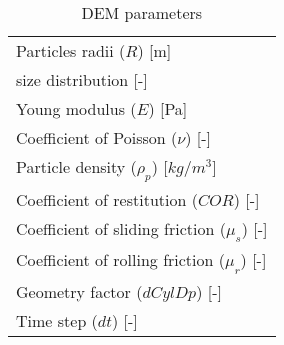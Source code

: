 \begin{table}[h]
\centering
\begin{tabular}{l}
\hline 
    Particles radii ($R$) [m]   \\ [5pt]

	size distribution [-] \\ [5pt]

    Young modulus ($E$) [Pa] \\ [5pt]

    Coefficient of Poisson ($\nu$) [-] \\ 
        \hline
    Particle density ($\rho_p$) [$kg/m^3$] \\ [5pt]
	Coefficient of restitution ($COR$) [-] \\ [5pt]
    Coefficient of sliding friction ($\mu_s$) [-] \\  [5pt]
    Coefficient of rolling friction ($\mu_r$) [-] \\ [5pt]
    Geometry factor ($dCylDp$) [-] \\ [5pt]
    Time step ($dt$) [-] \\ [5pt]


\hline
\end{tabular}
\caption{DEM parameters}
\label{tab:08DEMparameters}
\end{table}

